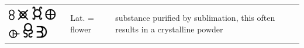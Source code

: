 \documentclass[british,final,landscape]{scrartcl}
\begin{document}
\begin{refsection}
\begin{supertabular}{p{0.3\textwidth}p{0.34\textwidth}p{0.34\textwidth}}
   \includegraphics[height=5mm]{Mixtures/Flores} \includegraphics[width=5mm]{Mixtures/Flores2} \includegraphics[width=5mm]{Mixtures/Flores3} \includegraphics[width=5mm]{Mixtures/Flores4} \includegraphics[width=5mm]{Mixtures/Flores5} \includegraphics[width=5mm]{Mixtures/Flores6} \includegraphics[width=5mm]{Mixtures/Flores7} & Lat.  = flower & substance purified by sublimation, this often results in a crystalline powder \\

\end{supertabular}
\end{refsection}
\end{document}
